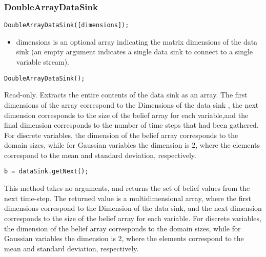 \subsubsection{DoubleArrayDataSink}

\ifmatlab
\begin{lstlisting}
DoubleArrayDataSink([dimensions]);
\end{lstlisting}

\begin{itemize}
\item dimensions is an optional array indicating the matrix dimensions of the data sink (an empty argument indicates a single data sink to connect to a single variable stream).
\end{itemize}
\fi

\ifjava
\begin{lstlisting}
DoubleArrayDataSink();
\end{lstlisting}
\fi




Read-only.  Extracts the entire contents of the data sink as an array.  The first dimensions of the array correspond to the Dimensions of the data sink \ifmatlab, the next dimension corresponds to the size of the belief array for each variable,\fi and the final dimension corresponds to the number of time steps that had been gathered.  For discrete variables, the dimension of the belief array corresponds to the domain sizes, while for Gaussian variables the dimension is 2, where the elements correspond to the mean and standard deviation, respectively.





\ifmatlab
\begin{lstlisting}
b = dataSink.getNext();
\end{lstlisting}

This method takes no arguments, and returns the set of belief values from the next time-step.  The returned value is a multidimensional array, where the first dimensions correspond to the Dimension of the data sink, and the next dimension corresponds to the size of the belief array for each variable.  For discrete variables, the dimension of the belief array corresponds to the domain sizes, while for Gaussian variables the dimension is 2, where the elements correspond to the mean and standard deviation, respectively.

